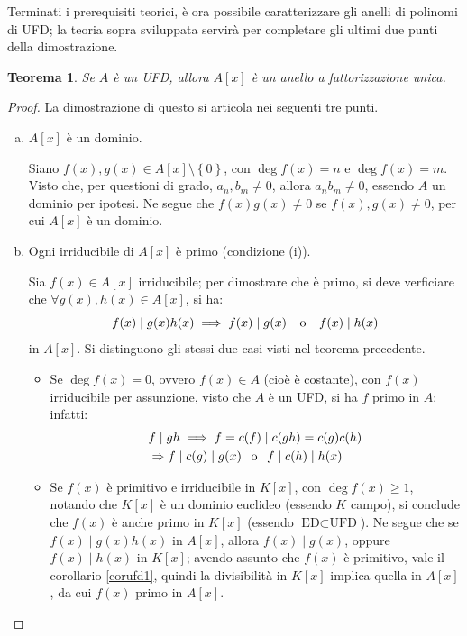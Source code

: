 \documentclass[12pt]{scrartcl}
\theoremstyle{style}
\newtheorem{teorema}{Teorema}[section]
\numberwithin{equation}{subsection}
\begin{document}
\noindent Terminati i prerequisiti teorici, \`e ora possibile caratterizzare gli anelli di polinomi di UFD; la teoria sopra sviluppata servir\`a per completare gli ultimi due punti della dimostrazione.
\begin{teorema}\label{th1an}
	Se $A$ \`e un UFD, allora $A[x]$ \`e un anello a fattorizzazione unica.
\end{teorema}
	\begin{proof}
		La dimostrazione di questo si articola nei seguenti tre punti.
		\begin{enumerate}[(a).]
			\item $A[x]$ \`e un dominio.

				Siano $f(x), g(x) \in A[x] \setminus\left\{ 0 \right\} $, con $\operatorname{deg} f(x) = n$ e $\operatorname{deg} f(x) = m$.
				Visto che, per questioni di grado, $a_n,b_m\neq 0$, allora $a_nb_m \neq 0$, essendo $A$ un dominio per ipotesi.
				Ne segue che $f(x) g(x) \neq 0$ se $f(x),g(x) \neq 0$, per cui $A[x]$ \`e un dominio.
			\item Ogni irriducibile di $A[x]$ \`e primo (condizione (i)).

				Sia $f(x) \in A[x]$ irriducibile; per dimostrare che \`e primo, si deve verficiare che $\forall g(x),h(x) \in A[x]$, si ha:
				\[
				f(x)  \mid g(x) h(x) \implies f(x)  \mid g(x) \hspace{.25cm} \text{ o } \hspace{.25cm} f(x)  \mid h(x)
				\] 
				in $A[x]$.
				Si distinguono gli stessi due casi visti nel teorema precedente.
				\begin{itemize}
					\item Se $\operatorname{deg} f(x) = 0 $, ovvero $f(x)  \in A$ (cio\`e \`e costante), con $f(x)$ irriducibile per assunzione, visto che $A$ \`e un UFD, si ha $f$ primo in $A$; infatti:
						\[
							\begin{split}
								&f \mid gh \implies f=c(f)  \mid c(gh) = c(g) c(h) \\
						&\Rightarrow f \mid c(g)  \mid g(x) \hspace{.15cm} \text{ o }\hspace{.15cm} f  \mid c(h)  \mid h(x)
							\end{split}
						\] 
					\item Se $f(x)$ \`e primitivo e irriducibile in $K[x]$, con $\operatorname{deg} f(x) \ge 1$, notando che $K[x]$ \`e un dominio euclideo (essendo $K$ campo), si conclude che $f(x)$ \`e anche primo in $K[x]$ (essendo $\text{ED}\subset \text{UFD}$).
						Ne segue che se $f(x)  \mid g(x) h(x)$ in $A[x]$, allora $f(x)  \mid g(x)$, oppure $f(x)  \mid h(x)$ in $K[x]$; avendo assunto che $f(x)$ \`e primitivo, vale il corollario \ref{corufd1}, quindi la divisibilit\`a in $K[x]$ implica quella in $A[x]$, da cui $f(x)$ primo in $A[x]$.
						

\end{itemize}
\end{enumerate}
\end{proof}
\end{document}
